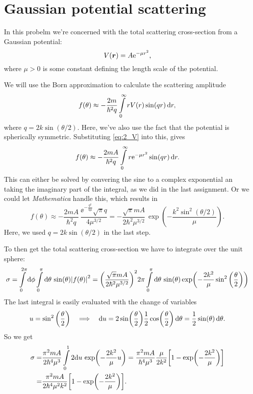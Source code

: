 \documentclass[11pt,letter, swedish, english
]{article}
\begin{document}
\section{Gaussian potential scattering}
In this probelm we're concerned with the total scattering
cross-section from a Gaussian potential:
\begin{equation}\label{eq:2_V}
V(\vb*{r})=A\mathrm{e}^{-\mu r^2},
\end{equation}
where $\mu>0$ is some constant defining the length scale of the potential.

We will use the Born approximation to calculate the scattering
amplitude
\begin{equation}
f(\theta)\approx -\frac{2m}{\hbar^2q}
\int_0^\infty r V(r) \sin(qr)\id{r},
\end{equation}
where $q=2k\sin(\theta/2)$. Here, we've also use the fact that the
potential is spherically symmetric.
Substituting \eqref{eq:2_V} into this, gives
\begin{equation}
f(\theta)\approx -\frac{2mA}{\hbar^2q}
\int_0^\infty r \ee^{-\mu r^2} \sin(qr)\id{r}.
\end{equation}
This can either be solved by convering the sine to a complex
exponential an taking the imaginary part of the integral, as we did in
the last assignment. Or we could let \textit{Mathematica} handle this,
which results in
\begin{equation}
f(\theta)\approx -\frac{2mA}{\hbar^2q}\,
\frac{\ee^{-\frac{q^2}{4\mu}}\sqrt{\pi}q}{4\mu^{3/2}}
=-\frac{\sqrt{\pi}mA}{2\hbar^2\mu^{3/2}}\,\exp(-\frac{k^2\sin^2(\theta/2)}{\mu}).
\end{equation}
Here, we used $q=2k\sin(\theta/2)$ in the last step.

To then get the total scattering cross-section we have to integrate
over the unit sphere:
\begin{equation}
\sigma=\int_0^{2\pi}\rd{\phi}
\int_0^\pi\rd\theta\,\sin(\theta) \abs{f(\theta)}^2
=\qty(\frac{\sqrt{\pi}mA}{2\hbar^2\mu^{3/2}})^2 2\pi 
\int_0^\pi\rd\theta\,\sin(\theta)
\exp(-\frac{2k^2}{\mu}\sin^2\qty(\frac{\theta}{2}))
\end{equation}
The last integral is easily evaluated with the change of variables
\begin{equation}
u=\sin^2\qty(\frac{\theta}{2})
\quad\Longrightarrow\quad
\mathrm{d}{u}=
2\sin(\frac{\theta}{2})\frac{1}{2}\cos(\frac{\theta}{2})\,\mathrm{d}\theta
=\frac{1}{2}\sin(\theta)\,\mathrm{d}\theta.
\end{equation}
So we get
\begin{equation}\label{eq:2_final}
\begin{aligned}
\sigma=&
\frac{\pi^2mA}{2\hbar^4\mu^{3}}  
\int_0^1 2\rd{u}\,\exp(-\frac{2k^2}{\mu}u)
=\frac{\pi^2mA}{\hbar^4\mu^{3}} \frac{\mu}{2k^2}
\qty[1-\exp(-\frac{2k^2}{\mu})]\\
=&\frac{\pi^2mA}{2\hbar^4\mu^{2}k^2}
\qty[1-\exp(-\frac{2k^2}{\mu})].
\end{aligned}
\end{equation}
\end{document}
